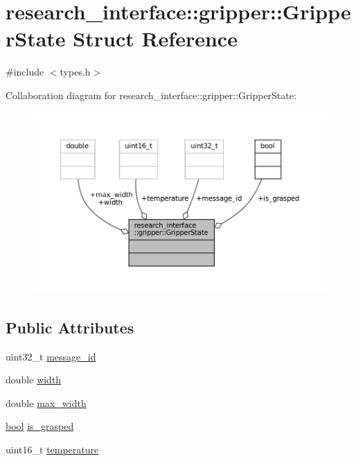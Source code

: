 \hypertarget{structresearch__interface_1_1gripper_1_1GripperState}{}\section{research\+\_\+interface\+:\+:gripper\+:\+:Gripper\+State Struct Reference}
\label{structresearch__interface_1_1gripper_1_1GripperState}


{\ttfamily \#include $<$types.\+h$>$}



Collaboration diagram for research\+\_\+interface\+:\+:gripper\+:\+:Gripper\+State\+:
\nopagebreak
\begin{figure}[H]
\begin{center}
\leavevmode
\includegraphics[width=350pt]{structresearch__interface_1_1gripper_1_1GripperState__coll__graph}
\end{center}
\end{figure}
\subsection*{Public Attributes}
\begin{DoxyCompactItemize}
\item 
uint32\+\_\+t \hyperlink{structresearch__interface_1_1gripper_1_1GripperState_a02317c645fda5117638a1571c66591ae}{message\+\_\+id}
\item 
double \hyperlink{structresearch__interface_1_1gripper_1_1GripperState_a7643e3d629b1add9c2ac13342f11da6d}{width}
\item 
double \hyperlink{structresearch__interface_1_1gripper_1_1GripperState_af4c06b1920fff49a7635c54460282483}{max\+\_\+width}
\item 
\hyperlink{classbool}{bool} \hyperlink{structresearch__interface_1_1gripper_1_1GripperState_a7c7120eff84cc9b460cf079dce6a2a7a}{is\+\_\+grasped}
\item 
uint16\+\_\+t \hyperlink{structresearch__interface_1_1gripper_1_1GripperState_ab96bb42ece0247d8c0111198f6fbe4d4}{temperature}
\end{DoxyCompactItemize}


